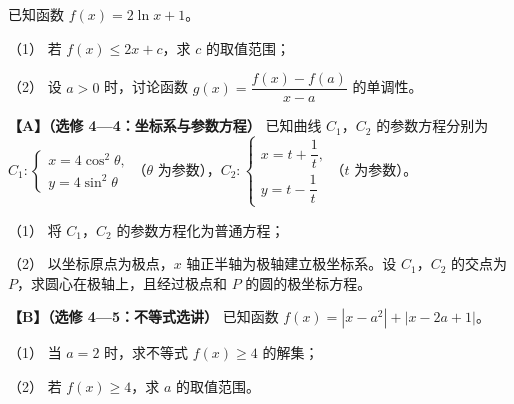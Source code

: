 \begin{question}
已知函数 $f(x)=2\ln x+1$。

（1） 若 $f(x)\leqslant2x+c$，求 $c$ 的取值范围；

（2） 设 $a>0$ 时，讨论函数 $g(x)=\dfrac{f(x)-f(a)}{x-a}$ 的单调性。

\end{question}
\begin{question}
\textbf{【A】（选修 4—4：坐标系与参数方程）} 已知曲线 $C_1$，$C_2$ 的参数方程分别为 $C_1:\begin{cases}x=4\cos^2\theta,\\y=4\sin^2\theta\end{cases}$（$\theta$ 为参数），$C_2:\begin{cases}x=t+\dfrac1t,\\y=t-\dfrac1t\end{cases}$（$t$ 为参数）。

（1） 将 $C_1$，$C_2$ 的参数方程化为普通方程；

（2） 以坐标原点为极点，$x$ 轴正半轴为极轴建立极坐标系。设 $C_1$，$C_2$ 的交点为 $P$，求圆心在极轴上，且经过极点和 $P$ 的圆的极坐标方程。

\end{question}
\begin{question}
\textbf{【B】（选修 4—5：不等式选讲）} 已知函数 $f(x)=|x-a^2|+|x-2a+1|$。

（1） 当 $a=2$ 时，求不等式 $f(x)\geqslant4$ 的解集；

（2） 若 $f(x)\geqslant4$，求 $a$ 的取值范围。

\end{question}